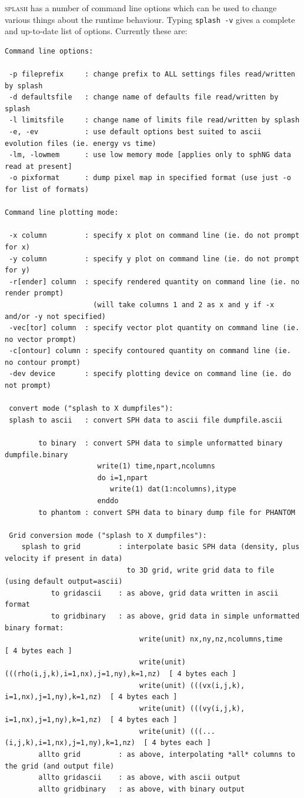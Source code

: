 \documentclass[a4paper,10pt]{article}
\newcommand{\splash}{\textsc{splash }}
\begin{document}
 \splash has a number of command line options which can be used to change various things about the runtime behaviour. Typing \verb+splash -v+ gives a complete and up-to-date list of options. Currently these are:
\begin{verbatim}
Command line options:

 -p fileprefix     : change prefix to ALL settings files read/written by splash 
 -d defaultsfile   : change name of defaults file read/written by splash
 -l limitsfile     : change name of limits file read/written by splash
 -e, -ev           : use default options best suited to ascii evolution files (ie. energy vs time)
 -lm, -lowmem      : use low memory mode [applies only to sphNG data read at present]
 -o pixformat      : dump pixel map in specified format (use just -o for list of formats)

Command line plotting mode:

 -x column         : specify x plot on command line (ie. do not prompt for x)
 -y column         : specify y plot on command line (ie. do not prompt for y)
 -r[ender] column  : specify rendered quantity on command line (ie. no render prompt)
                     (will take columns 1 and 2 as x and y if -x and/or -y not specified)
 -vec[tor] column  : specify vector plot quantity on command line (ie. no vector prompt)
 -c[ontour] column : specify contoured quantity on command line (ie. no contour prompt)
 -dev device       : specify plotting device on command line (ie. do not prompt)

 convert mode ("splash to X dumpfiles"): 
 splash to ascii   : convert SPH data to ascii file dumpfile.ascii

        to binary  : convert SPH data to simple unformatted binary dumpfile.binary 
                      write(1) time,npart,ncolumns
                      do i=1,npart
                         write(1) dat(1:ncolumns),itype
                      enddo
        to phantom : convert SPH data to binary dump file for PHANTOM

 Grid conversion mode ("splash to X dumpfiles"): 
    splash to grid         : interpolate basic SPH data (density, plus velocity if present in data)
                             to 3D grid, write grid data to file (using default output=ascii)
           to gridascii    : as above, grid data written in ascii format
           to gridbinary   : as above, grid data in simple unformatted binary format:
                                write(unit) nx,ny,nz,ncolumns,time                 [ 4 bytes each ]
                                write(unit) (((rho(i,j,k),i=1,nx),j=1,ny),k=1,nz)  [ 4 bytes each ]
                                write(unit) (((vx(i,j,k), i=1,nx),j=1,ny),k=1,nz)  [ 4 bytes each ]
                                write(unit) (((vy(i,j,k), i=1,nx),j=1,ny),k=1,nz)  [ 4 bytes each ]
                                write(unit) (((...(i,j,k),i=1,nx),j=1,ny),k=1,nz)  [ 4 bytes each ]
        allto grid         : as above, interpolating *all* columns to the grid (and output file)
        allto gridascii    : as above, with ascii output
        allto gridbinary   : as above, with binary output


\end{verbatim}
\end{document}
